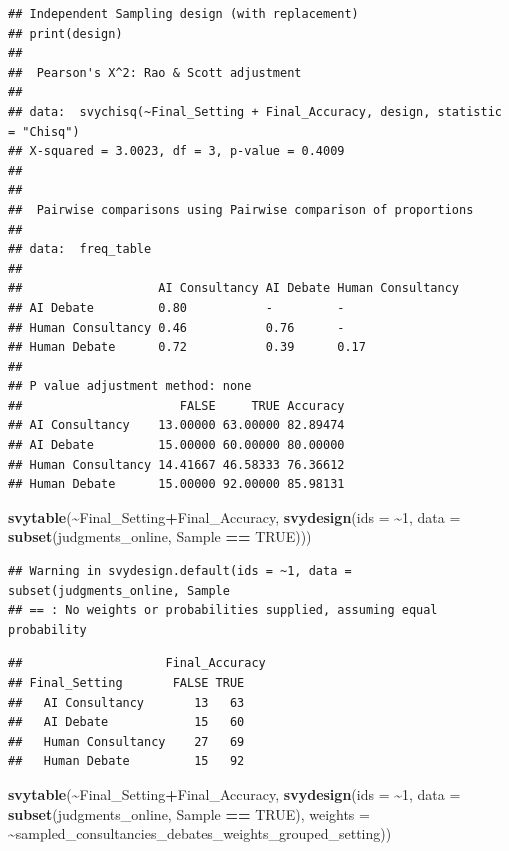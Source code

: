 \documentclass[
]{article}
\newenvironment{Shaded}{\begin{snugshade}}{\end{snugshade}}
\newcommand{\AttributeTok}[1]{\textcolor[rgb]{0.13,0.29,0.53}{#1}}
\newcommand{\ConstantTok}[1]{\textcolor[rgb]{0.56,0.35,0.01}{#1}}
\newcommand{\DecValTok}[1]{\textcolor[rgb]{0.00,0.00,0.81}{#1}}
\newcommand{\FunctionTok}[1]{\textcolor[rgb]{0.13,0.29,0.53}{\textbf{#1}}}
\newcommand{\NormalTok}[1]{#1}
\newcommand{\SpecialCharTok}[1]{\textcolor[rgb]{0.81,0.36,0.00}{\textbf{#1}}}
\newcommand{\StringTok}[1]{\textcolor[rgb]{0.31,0.60,0.02}{#1}}
\begin{document}
\begin{verbatim}
## Independent Sampling design (with replacement)
## print(design)
## 
##  Pearson's X^2: Rao & Scott adjustment
## 
## data:  svychisq(~Final_Setting + Final_Accuracy, design, statistic = "Chisq")
## X-squared = 3.0023, df = 3, p-value = 0.4009
## 
## 
##  Pairwise comparisons using Pairwise comparison of proportions 
## 
## data:  freq_table 
## 
##                   AI Consultancy AI Debate Human Consultancy
## AI Debate         0.80           -         -                
## Human Consultancy 0.46           0.76      -                
## Human Debate      0.72           0.39      0.17             
## 
## P value adjustment method: none 
##                      FALSE     TRUE Accuracy
## AI Consultancy    13.00000 63.00000 82.89474
## AI Debate         15.00000 60.00000 80.00000
## Human Consultancy 14.41667 46.58333 76.36612
## Human Debate      15.00000 92.00000 85.98131
\end{verbatim}

\begin{Shaded}
\begin{Highlighting}[]
\FunctionTok{svytable}\NormalTok{(}\SpecialCharTok{\textasciitilde{}}\NormalTok{Final\_Setting}\SpecialCharTok{+}\NormalTok{Final\_Accuracy, }\FunctionTok{svydesign}\NormalTok{(}\AttributeTok{ids =} \SpecialCharTok{\textasciitilde{}}\DecValTok{1}\NormalTok{, }\AttributeTok{data =} \FunctionTok{subset}\NormalTok{(judgments\_online, }\StringTok{\textasciigrave{}}\AttributeTok{Sample}\StringTok{\textasciigrave{}} \SpecialCharTok{==} \ConstantTok{TRUE}\NormalTok{)))}
\end{Highlighting}
\end{Shaded}

\begin{verbatim}
## Warning in svydesign.default(ids = ~1, data = subset(judgments_online, Sample
## == : No weights or probabilities supplied, assuming equal probability
\end{verbatim}

\begin{verbatim}
##                    Final_Accuracy
## Final_Setting       FALSE TRUE
##   AI Consultancy       13   63
##   AI Debate            15   60
##   Human Consultancy    27   69
##   Human Debate         15   92
\end{verbatim}

\begin{Shaded}
\begin{Highlighting}[]
\FunctionTok{svytable}\NormalTok{(}\SpecialCharTok{\textasciitilde{}}\NormalTok{Final\_Setting}\SpecialCharTok{+}\NormalTok{Final\_Accuracy, }\FunctionTok{svydesign}\NormalTok{(}\AttributeTok{ids =} \SpecialCharTok{\textasciitilde{}}\DecValTok{1}\NormalTok{, }\AttributeTok{data =} \FunctionTok{subset}\NormalTok{(judgments\_online, }\StringTok{\textasciigrave{}}\AttributeTok{Sample}\StringTok{\textasciigrave{}} \SpecialCharTok{==} \ConstantTok{TRUE}\NormalTok{), }\AttributeTok{weights =} \SpecialCharTok{\textasciitilde{}}\NormalTok{sampled\_consultancies\_debates\_weights\_grouped\_setting))}
\end{Highlighting}
\end{Shaded}
\end{document}
